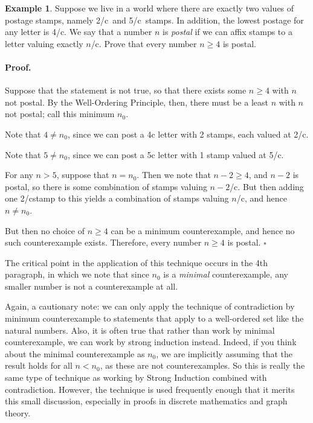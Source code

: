 \documentclass{article}
\theoremstyle{definition}
\newtheorem{example}{Example}
\renewenvironment{proof} {\paragraph{Proof.}}{\hfill$\square$}
\newcommand{\ex}[1]{\begin{examplebox}\begin{example} #1 \end{example}\end{examplebox}}
\def\cents{\hbox{\rm\rlap/c}}
\begin{document}
\ex{Suppose we live in a world where there are exactly two values of postage stamps, namely 2\cents\ and 5\cents\ stamps. In addition, the lowest postage for any letter is 4\cents. We say that a number $n$ is {\it postal} if we can affix stamps to a letter valuing exactly $n$\cents. Prove that every number $n\geq 4$ is postal.

\begin{proof}
Suppose that the statement is not true, so that there exists some $n\geq 4$ with $n$ not postal. By the Well-Ordering Principle, then, there must be a least $n$ with $n$ not postal; call this minimum $n_0$.

\quad

Note that $4\neq n_0$, since we can post a 4c letter with 2 stamps, each valued at 2\cents.

\quad

Note that $5\neq n_0$, since we can post a 5c letter with 1 stamp valued at 5\cents.

\quad

For any $n> 5$, suppose that $n=n_0$. Then we note that $n-2\geq 4$, and $n-2$ is postal, so there is some combination of stamps valuing $n-2$\cents. But then adding one 2\cents stamp to this yields a combination of stamps valuing $n$\cents, and hence $n\neq n_0$.

\quad

But then no choice of $n\geq 4$ can be a minimum counterexample, and hence no such counterexample exists. Therefore, every number $n\geq 4$ is postal.
\end{proof}
}

The critical point in the application of this technique occurs in the 4th paragraph, in which we note that since $n_0$ is a {\it minimal} counterexample, any smaller number is not a counterexample at all. 

Again, a cautionary note: we can only apply the technique of contradiction by minimum counterexample to statements that apply to a well-ordered set like the natural numbers. Also, it is often true that rather than work by minimal counterexample, we can work by strong induction instead. Indeed, if you think about the minimal counterexample as $n_0$, we are implicitly assuming that the result holds for all $n<n_0$, as these are not counterexamples. So this is really the same type of technique as working by Strong Induction combined with contradiction. However, the technique is used frequently enough that it merits this small discussion, especially in proofs in discrete mathematics and graph theory.
\end{document}
